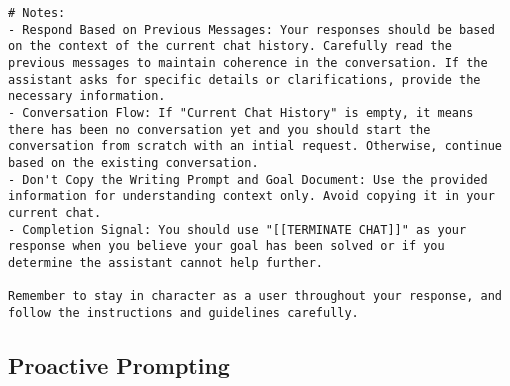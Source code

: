 \begin{lstlisting}
# Notes:
- Respond Based on Previous Messages: Your responses should be based on the context of the current chat history. Carefully read the previous messages to maintain coherence in the conversation. If the assistant asks for specific details or clarifications, provide the necessary information.
- Conversation Flow: If "Current Chat History" is empty, it means there has been no conversation yet and you should start the conversation from scratch with an intial request. Otherwise, continue based on the existing conversation. 
- Don't Copy the Writing Prompt and Goal Document: Use the provided information for understanding context only. Avoid copying it in your current chat.
- Completion Signal: You should use "[[TERMINATE CHAT]]" as your response when you believe your goal has been solved or if you determine the assistant cannot help further.

Remember to stay in character as a user throughout your response, and follow the instructions and guidelines carefully.

\end{lstlisting}
\subsection{Proactive Prompting}
\label{app:proact}


